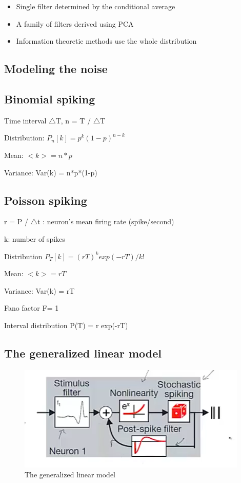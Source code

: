 \documentclass{book}
\begin{document}
 \begin{itemize}
 	\item{Single filter determined by the conditional average}
 	\item{A family of filters derived using PCA}
 	\item{Information theoretic methods use the whole distribution}
 \end{itemize}
 
 \subsection{Modeling the noise}
 
 \subsection{Binomial spiking}
 
 Time interval $\triangle$T, n = T / $\triangle$T
 
 Distribution: $P_n[k] = p^k(1-p)^{n-k}$
 
 Mean: $<k> = n*p$
 
 Variance: Var(k) = n*p*(1-p)
 
 \subsection{Poisson spiking}
 
 r = P / $\triangle$t : neuron's mean firing rate (spike/second)
 
 k: number of spikes

Distribution $P_T[k] = (rT)^k exp(-rT)/k!$ 

Mean: $<k> = rT$

Variance: Var(k) = rT

Fano factor  F= 1

Interval distribution P(T) = r exp(-rT)

\subsection{The generalized linear model}

\begin{figure}[h]
\centering
\includegraphics[width=0.7\linewidth]{figures/linearmodel}
\caption{The generalized linear model}
\label{fig:linearmodel}
\end{figure}
\end{document}
